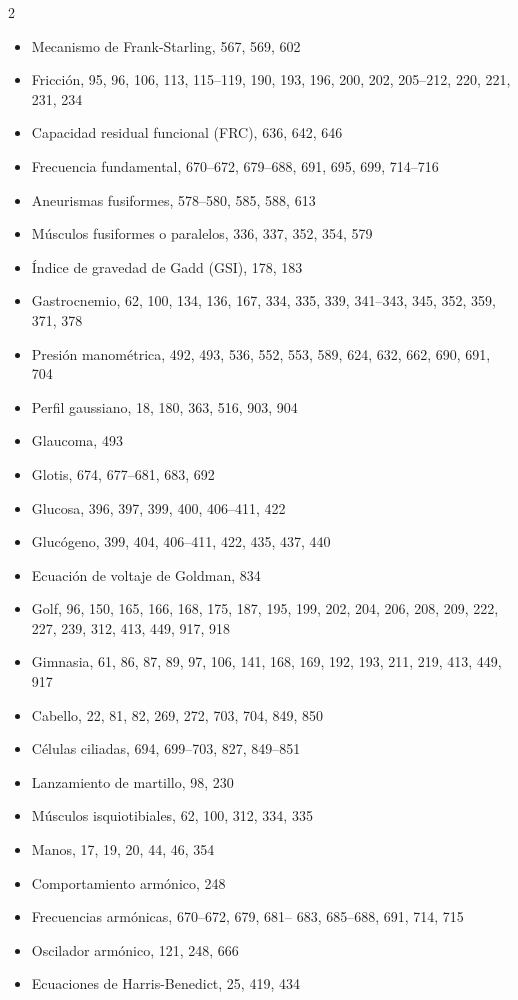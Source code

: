 \documentclass[12pt,a4paper]{book}
\begin{document}
\begin{multicols}{2}
\begin{itemize}[leftmargin=*]
  \item Mecanismo de Frank-Starling, 567, 569, 602
  \item Fricción, 95, 96, 106, 113, 115--119, 190, 193, 196, 200, 202, 205--212, 220, 221, 231, 234
  \item Capacidad residual funcional (FRC), 636, 642, 646
  \item Frecuencia fundamental, 670--672, 679--688, 691, 695, 699, 714--716
  \item Aneurismas fusiformes, 578--580, 585, 588, 613
  \item Músculos fusiformes o paralelos, 336, 337, 352, 354, 579
  \item Índice de gravedad de Gadd (GSI), 178, 183
  \item Gastrocnemio, 62, 100, 134, 136, 167, 334, 335, 339, 341--343, 345, 352, 359, 371, 378
  \item Presión manométrica, 492, 493, 536, 552, 553, 589, 624, 632, 662, 690, 691, 704
  \item Perfil gaussiano, 18, 180, 363, 516, 903, 904
  \item Glaucoma, 493
  \item Glotis, 674, 677--681, 683, 692
  \item Glucosa, 396, 397, 399, 400, 406--411, 422
  \item Glucógeno, 399, 404, 406--411, 422, 435, 437, 440
  \item Ecuación de voltaje de Goldman, 834
  \item Golf, 96, 150, 165, 166, 168, 175, 187, 195, 199, 202, 204, 206, 208, 209, 222, 227, 239, 312, 413, 449, 917, 918
  \item Gimnasia, 61, 86, 87, 89, 97, 106, 141, 168, 169, 192, 193, 211, 219, 413, 449, 917
  \item Cabello, 22, 81, 82, 269, 272, 703, 704, 849, 850
  \item Células ciliadas, 694, 699--703, 827, 849--851
  \item Lanzamiento de martillo, 98, 230
  \item Músculos isquiotibiales, 62, 100, 312, 334, 335
  \item Manos, 17, 19, 20, 44, 46, 354
  \item Comportamiento armónico, 248
  \item Frecuencias armónicas, 670--672, 679, 681-- 683, 685--688, 691, 714, 715
  \item Oscilador armónico, 121, 248, 666
  \item Ecuaciones de Harris-Benedict, 25, 419, 434

\end{itemize}
\end{multicols}
\end{document}
